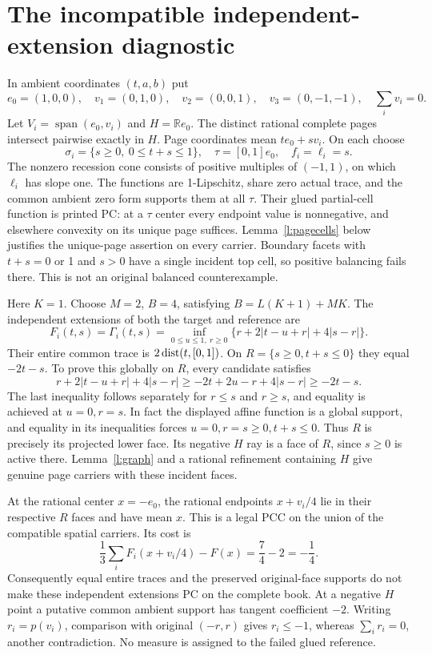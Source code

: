 \documentclass[11pt]{article}
\theoremstyle{definition}\newtheorem{definition}[theorem]{Definition}
\theoremstyle{remark}\newtheorem{remark}[theorem]{Remark}
\newcommand{\R}{\mathbb R}\newcommand{\Q}{\mathbb Q}
\begin{document}
\section{The incompatible independent-extension diagnostic}\label{s:diagnostic}
In ambient coordinates $(t,a,b)$ put
\[
 e_0=(1,0,0),\quad v_1=(0,1,0),\quad v_2=(0,0,1),\quad
 v_3=(0,-1,-1),\quad \sum_i v_i=0.
\]
Let $V_i=\operatorname{span}(e_0,v_i)$ and $H=\R e_0$. The distinct rational complete pages intersect pairwise exactly in $H$. Page coordinates mean $t e_0+s v_i$. On each choose
\[
 \sigma_i=\{s\geq0,\ 0\leq t+s\leq1\},\quad
 \tau=[0,1]e_0,\quad f_i=\ell_i=s.
\]
The nonzero recession cone consists of positive multiples of $(-1,1)$, on which $\ell_i$ has slope one. The functions are 1-Lipschitz, share zero actual trace, and the common ambient zero form supports them at all $\tau$. Their glued partial-cell function is printed PC: at a $\tau$ center every endpoint value is nonnegative, and elsewhere convexity on its unique page suffices. Lemma~\ref{l:pagecells} below justifies the unique-page assertion on every carrier. Boundary facets with $t+s=0$ or 1 and $s>0$ have a single incident top cell, so positive balancing fails there. This is not an original balanced counterexample.

Here $K=1$. Choose $M=2$, $B=4$, satisfying $B=L(K+1)+MK$. The independent extensions of both the target and reference are
\[
 F_i(t,s)=\Gamma_i(t,s)
 =\inf_{0\leq u\leq1,\ r\geq0}
 \{r+2|t-u+r|+4|s-r|\}.
\]
Their entire common trace is $2\operatorname{dist}(t,[0,1])$. On $R=\{s\geq0,t+s\leq0\}$ they equal $-2t-s$. To prove this globally on $R$, every candidate satisfies
\[
 r+2|t-u+r|+4|s-r|
 \geq -2t+2u-r+4|s-r|\geq -2t-s.
\]
The last inequality follows separately for $r\leq s$ and $r\geq s$, and equality is achieved at $u=0,r=s$. In fact the displayed affine function is a global support, and equality in its inequalities forces $u=0,r=s\geq0,t+s\leq0$. Thus $R$ is precisely its projected lower face. Its negative $H$ ray is a face of $R$, since $s\geq0$ is active there. Lemma~\ref{l:graph} and a rational refinement containing $H$ give genuine page carriers with these incident faces.

At the rational center $x=-e_0$, the rational endpoints $x+v_i/4$ lie in their respective $R$ faces and have mean $x$. This is a legal PCC on the union of the compatible spatial carriers. Its cost is
\[
 \frac13\sum_i F_i(x+v_i/4)-F(x)=\frac74-2=-\frac14.
\]
Consequently equal entire traces and the preserved original-face supports do not make these independent extensions PC on the complete book. At a negative $H$ point a putative common ambient support has tangent coefficient $-2$. Writing $r_i=p(v_i)$, comparison with original $(-r,r)$ gives $r_i\leq-1$, whereas $\sum_i r_i=0$, another contradiction. No measure is assigned to the failed glued reference.
\end{document}
